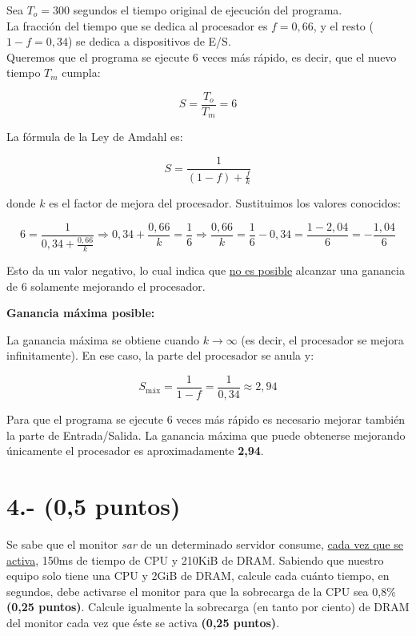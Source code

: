 \documentclass[a4paper,12pt]{article}
\begin{document}
Sea $T_o = 300$ segundos el tiempo original de ejecución del programa. \\

La fracción del tiempo que se dedica al procesador es $f = 0{,}66$, y el resto ($1 - f = 0{,}34$) se dedica a dispositivos de E/S. \\

Queremos que el programa se ejecute $6$ veces más rápido, es decir, que el nuevo tiempo $T_m$ cumpla:

\[
S = \frac{T_o}{T_m} = 6
\]

La fórmula de la Ley de Amdahl es:

\[
S = \frac{1}{(1 - f) + \frac{f}{k}}
\]

donde $k$ es el factor de mejora del procesador. Sustituimos los valores conocidos:

\[
6 = \frac{1}{0{,}34 + \frac{0{,}66}{k}} \Rightarrow
0{,}34 + \frac{0{,}66}{k} = \frac{1}{6}
\Rightarrow
\frac{0{,}66}{k} = \frac{1}{6} - 0{,}34 = \frac{1 - 2{,}04}{6} = -\frac{1{,}04}{6}
\]

Esto da un valor negativo, lo cual indica que \underline{no es posible} alcanzar una ganancia de 6 solamente mejorando el procesador.

\vspace{0.2cm}
\textbf{Ganancia máxima posible:}

La ganancia máxima se obtiene cuando $k \to \infty$ (es decir, el procesador se mejora infinitamente). En ese caso, la parte del procesador se anula y:

\[
S_{\text{máx}} = \frac{1}{1 - f} = \frac{1}{0{,}34} \approx 2{,}94
\]

Para que el programa se ejecute 6 veces más rápido es necesario mejorar también la parte de Entrada/Salida. La ganancia máxima que puede obtenerse mejorando únicamente el procesador es aproximadamente \textbf{2,94}.

\section*{4.- (0,5 puntos)}
Se sabe que el monitor \textit{sar} de un determinado servidor consume, \underline{cada vez que se activa}, 150ms de tiempo de CPU y 210KiB de DRAM. Sabiendo que nuestro equipo solo tiene una CPU y 2GiB de DRAM, calcule cada cuánto tiempo, en segundos, debe activarse el monitor para que la sobrecarga de la CPU sea 0,8\% \textbf{(0,25 puntos)}. Calcule igualmente la sobrecarga (en tanto por ciento) de DRAM del monitor cada vez que éste se activa \textbf{(0,25 puntos)}.
\end{document}
